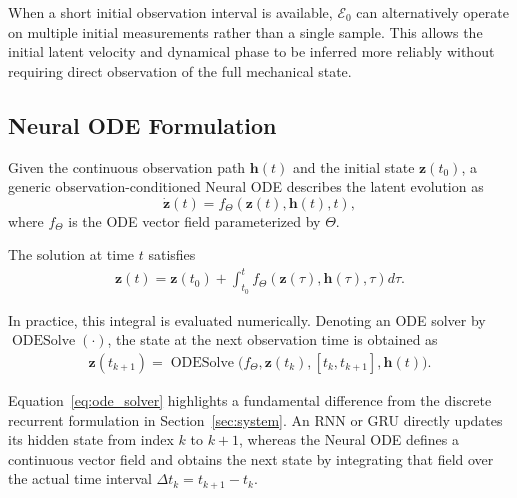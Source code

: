 \documentclass[journal,twoside]{IEEEtran}
\begin{document}
When a short initial observation interval is available,
$\mathcal{E}_{0}$ can alternatively operate on multiple initial
measurements rather than a single sample. This allows the initial latent
velocity and dynamical phase to be inferred more reliably without requiring
direct observation of the full mechanical state.


\subsection{Neural ODE Formulation}
\label{subsec:node}

Given the continuous observation path $\mathbf{h}(t)$ and the initial state
$\mathbf{z}(t_0)$, a generic observation-conditioned Neural ODE describes the
latent evolution as
\begin{equation}
    \dot{\mathbf{z}}(t)
    =
    f_{\Theta}
    \left(
        \mathbf{z}(t),
        \mathbf{h}(t),
        t
    \right),
    \label{eq:generic_node}
\end{equation}
where $f_{\Theta}$ is the ODE vector field parameterized by $\Theta$.

The solution at time $t$ satisfies
\begin{equation}
\begin{aligned}
    \mathbf{z}(t)
    =
    \mathbf{z}(t_0)
    +
    \int_{t_0}^{t}
    f_{\Theta}
    \left(
        \mathbf{z}(\tau),
        \mathbf{h}(\tau),
        \tau
    \right)d\tau .
\end{aligned}
\label{eq:node_integral}
\end{equation}

In practice, this integral is evaluated numerically. Denoting an ODE solver
by $\operatorname{ODESolve}(\cdot)$, the state at the next observation time
is obtained as
\begin{equation}
\begin{aligned}
    \mathbf{z}(t_{k+1})
    =
    \operatorname{ODESolve}
    \Big(
        f_{\Theta},
        \mathbf{z}(t_k),
        [t_k,t_{k+1}],
        \mathbf{h}(t)
    \Big).
\end{aligned}
\label{eq:ode_solver}
\end{equation}

Equation~\eqref{eq:ode_solver} highlights a fundamental difference from the
discrete recurrent formulation in Section~\ref{sec:system}. An RNN or GRU
directly updates its hidden state from index $k$ to $k+1$, whereas the Neural
ODE defines a continuous vector field and obtains the next state by
integrating that field over the actual time interval
$\Delta t_k=t_{k+1}-t_k$.
\end{document}
